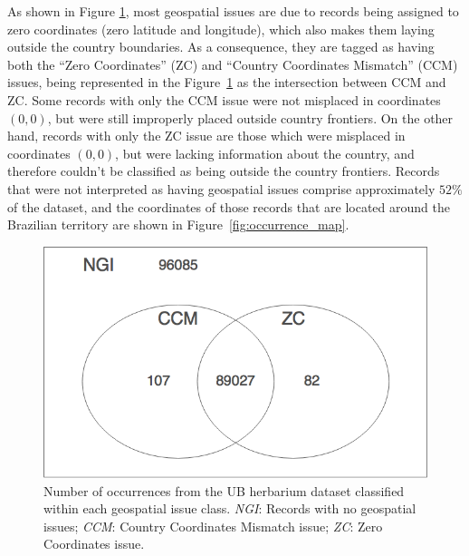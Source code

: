 As shown in Figure \ref{fig:venn_geospatial_issues}, most geospatial issues are due to records being assigned to zero coordinates (zero latitude and longitude), which also makes them laying outside the country boundaries. 
As a consequence, they are tagged as having both the ``Zero Coordinates'' (ZC) and ``Country Coordinates Mismatch'' (CCM) issues, being represented in the Figure~\ref{fig:venn_geospatial_issues} as the intersection between CCM and ZC.
Some records with only the CCM issue were not misplaced in coordinates $(0,0)$, but were still improperly placed outside country frontiers. 
On the other hand, records with only the ZC issue are those which were misplaced in coordinates $(0,0)$, but were lacking information about the country, and therefore couldn't be classified as being outside the country frontiers.
Records that were not interpreted as having geospatial issues comprise approximately $52\%$ of the dataset, and the coordinates of those records that are located around the Brazilian territory are shown in Figure~\ref{fig:occurrence_map}. 

  \begin{figure}[ht]
  	\centering
    \includegraphics[width=0.6\linewidth]{figures/venn_geospatial_issues.png}
    \caption[Number of occurrences from the UB herbarium dataset classified within each geospatial issue class]{Number of occurrences from the UB herbarium dataset classified within each geospatial issue class. \textit{NGI}: Records with no geospatial issues; \textit{CCM}: Country Coordinates Mismatch issue; \textit{ZC}: Zero Coordinates issue.}
    \label{fig:venn_geospatial_issues}
  \end{figure}


